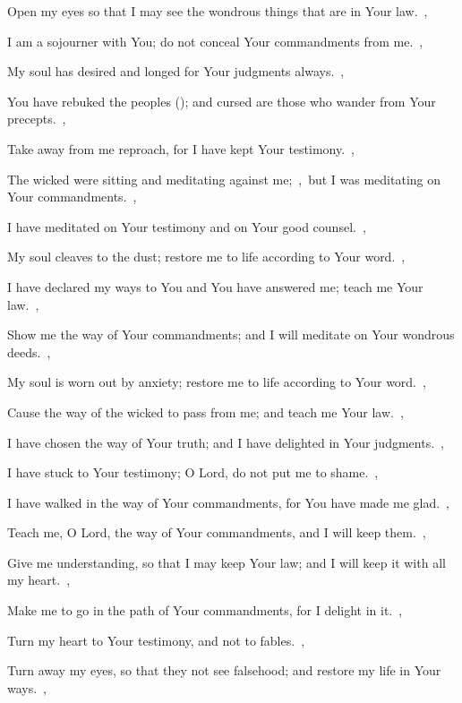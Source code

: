 \documentclass[12pt,twoside,a5paper]{article}
\begin{document}
\begin{normalparskip}
  Open my eyes so that I may see the wondrous things that are in Your law.~\sep

  I am a sojourner with You; do not conceal Your commandments from me.~\sep

  My soul has desired and longed for Your judgments always.~\sep

  You have rebuked the peoples (); and cursed are those who wander from Your precepts.~\sep

  Take away from me reproach, for I have kept Your testimony.~\sep

  The wicked were sitting and meditating against me;~\sep\ but I was meditating on Your commandments.~\sep

  I have meditated on Your testimony and on Your good counsel.~\sep

   My soul cleaves to the dust; restore me to life according to Your word.~\sep


  I have declared my ways to You and You have answered me; teach me Your law.~\sep

  Show me the way of Your commandments; and I will meditate on Your wondrous deeds.~\sep

  My soul is worn out by anxiety; restore me to life according to Your word.~\sep

  Cause the way of the wicked to pass from me; and teach me Your law.~\sep

  I have chosen the way of Your truth; and I have delighted in Your judgments.~\sep

  I have stuck to Your testimony; O Lord, do not put me to shame.~\sep

  I have walked in the way of Your commandments, for You have made me glad.~\sep

   Teach me, O Lord, the way of Your commandments, and I will keep them.~\sep


  Give me understanding, so that I may keep Your law; and I will keep it with all my heart.~\sep

  Make me to go in the path of Your commandments, for I delight in it.~\sep

  Turn my heart to Your testimony, and not to fables.~\sep

  Turn away my eyes, so that they not see falsehood; and restore my life in Your ways.~\sep


\end{normalparskip}
\end{document}
